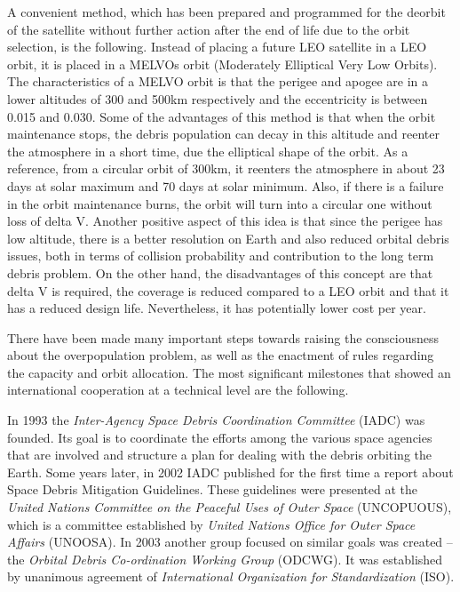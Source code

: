 \bigskip
A convenient method, which has been prepared and programmed for the deorbit of the satellite without further action after the end of life due to the orbit selection, is the following. Instead of placing a future LEO satellite in a LEO orbit, it is placed in a MELVOs orbit (Moderately Elliptical Very Low Orbits). The characteristics of a MELVO orbit is that the perigee and apogee are in a lower altitudes of 300 and 500km respectively and the eccentricity is between 0.015 and 0.030. Some of the advantages of this method is that when the orbit maintenance stops, the debris population can decay in this altitude and reenter the atmosphere in a short time, due the elliptical shape of the orbit. As a reference, from a circular orbit of 300km, it reenters the atmosphere in about 23 days at solar maximum and 70 days at solar minimum. Also, if there is a failure in the orbit maintenance burns, the orbit will turn into a circular one without loss of delta V. Another positive aspect of this idea is that since the perigee has low altitude, there is a better resolution on Earth and also reduced orbital debris issues, both in terms of collision probability and contribution to the long term debris problem. \cite{Kramer 2002} On the other hand, the disadvantages of this concept are that delta V is required, the coverage is reduced compared to a LEO orbit and that it has a reduced design life. Nevertheless, it has potentially lower cost per year.

\bigskip
There have been made many important steps towards raising the consciousness about the overpopulation problem, as well as the enactment of rules regarding the capacity and orbit allocation. The most significant milestones that showed an international cooperation at a technical level are the following.

In 1993 the \textit{Inter-Agency Space Debris Coordination Committee} (IADC) was founded. Its goal is to coordinate the efforts among the various space agencies that are involved and structure a plan for dealing with the debris orbiting the Earth. Some years later, in 2002 IADC published for the first time a report about Space Debris Mitigation Guidelines. \cite{UNOOSA} %
These guidelines were presented at the \textit{United Nations Committee on the Peaceful Uses of Outer Space} (UNCOPUOUS), which is a committee established by \textit{United Nations Office for Outer Space Affairs} (UNOOSA). \cite{IADC 2007} In 2003 another group focused on similar goals was created – the \textit{Orbital Debris Co-ordination Working Group} (ODCWG). It was established by unanimous agreement of \textit{International Organization for Standardization} (ISO). \cite{Klinkrad 2006}

